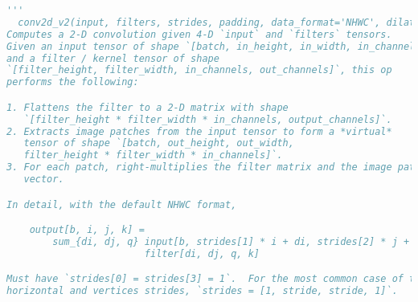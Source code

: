 \begin{lstlisting}[language=python, title=tf.nn.conv2d~~参数说明]
  '''
  conv2d_v2(input, filters, strides, padding, data_format='NHWC', dilations=None, name=None)
Computes a 2-D convolution given 4-D `input` and `filters` tensors.
Given an input tensor of shape `[batch, in_height, in_width, in_channels]`
and a filter / kernel tensor of shape
`[filter_height, filter_width, in_channels, out_channels]`, this op
performs the following:

1. Flattens the filter to a 2-D matrix with shape
   `[filter_height * filter_width * in_channels, output_channels]`.
2. Extracts image patches from the input tensor to form a *virtual*
   tensor of shape `[batch, out_height, out_width,
   filter_height * filter_width * in_channels]`.
3. For each patch, right-multiplies the filter matrix and the image patch
   vector.

In detail, with the default NHWC format,

    output[b, i, j, k] =
        sum_{di, dj, q} input[b, strides[1] * i + di, strides[2] * j + dj, q] *
                        filter[di, dj, q, k]

Must have `strides[0] = strides[3] = 1`.  For the most common case of the same
horizontal and vertices strides, `strides = [1, stride, stride, 1]`.


\end{lstlisting}
